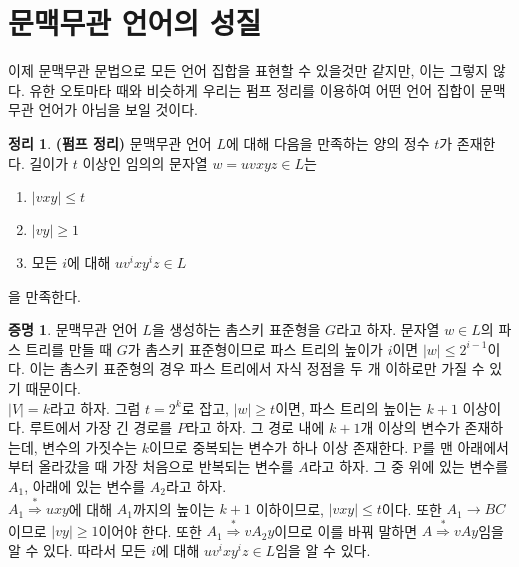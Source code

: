 \documentclass[b5paper, 11pt]{book}
\theoremstyle{definition}
\newtheorem{thm}[defn]{정리}
\newtheorem*{pf}{증명}
\begin{document}
\section{문맥무관 언어의 성질}
이제 문맥무관 문법으로 모든 언어 집합을 표현할 수 있을것만 같지만, 이는 그렇지 않다. 유한 오토마타 때와 비슷하게 우리는 펌프 정리를 이용하여 어떤 언어 집합이 문맥무관 언어가 아님을 보일 것이다.
\begin{thm}
\textbf{(펌프 정리)} 문맥무관 언어 $L$에 대해 다음을 만족하는 양의 정수 $t$가 존재한다. 길이가 $t$ 이상인 임의의 문자열 $w = uvxyz\in L$는
\begin{enumerate}
    \item $\vert vxy \vert \le t$ 
    \item $\vert vy \vert \ge 1$ 
    \item 모든 $i$에 대해 $uv^i xy^i z \in L$
\end{enumerate}
을 만족한다. 
\end{thm}
\begin{pf}
문맥무관 언어 $L$을 생성하는 촘스키 표준형을 $G$라고 하자. 문자열 $w \in L$의 파스 트리를 만들 때 $G$가 촘스키 표준형이므로 파스 트리의 높이가 $i$이면 $\vert w\vert \le 2^{i-1}$이다. 이는 촘스키 표준형의 경우 파스 트리에서 자식 정점을 두 개 이하로만 가질 수 있기 때문이다. \\ 
$\vert V \vert = k$라고 하자. 그럼 $t = 2^{k}$로 잡고, $\vert w  \vert \ge t$이면, 파스 트리의 높이는 $k+1$ 이상이다. 루트에서 가장 긴 경로를 $P$라고 하자. 그 경로 내에 $k+1$개 이상의 변수가 존재하는데, 변수의 가짓수는 $k$이므로 중복되는 변수가 하나 이상 존재한다. P를 맨 아래에서부터 올라갔을 때 가장 처음으로 반복되는 변수를 $A$라고 하자. 그 중 위에 있는 변수를 $A_1$, 아래에 있는 변수를 $A_2$라고 하자.  \\ 
$A_1 \overset{*}{\Rightarrow} uxy$에 대해 $A_1$까지의 높이는 $k+1$ 이하이므로, $\vert vxy\vert \le t$이다. 또한 $A_1 \rightarrow BC$이므로 $\vert vy\vert \ge 1$이어야 한다. 또한 $A_1 \overset{*}{\Rightarrow} vA_2y $이므로 이를 바꿔 말하면 $A \overset{*}{\Rightarrow} vAy$임을 알 수 있다. 따라서 모든 $i$에 대해 $uv^i x y^i z \in L$임을 알 수 있다. 
\end{pf}
\begin{figure}[!ht]
    \centering
\caption{}
\end{figure}
\end{document}
